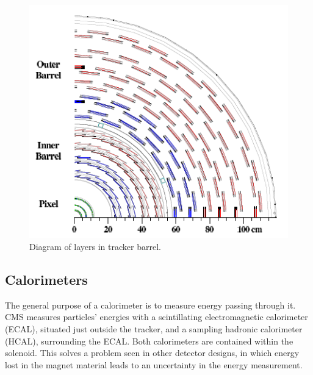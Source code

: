  \begin{figure}[htb]
  \begin{center}
    \includegraphics[width=360pt]{Figures/tracker-schematic.png}
  \end{center}
  \caption[\fixspacing Diagram of layers in tracker barrel]
	  {\fixspacing Diagram of layers in tracker barrel.}
  \label{fig:TrackerBarrel}
 \end{figure}

\subsection{Calorimeters}
\label{exp:cal}
The general purpose of a calorimeter 
is to measure energy passing through it.  
CMS measures %
particles' energies 
with a scintillating electromagnetic calorimeter (ECAL),
situated just outside the tracker,
and a sampling hadronic calorimeter (HCAL),
surrounding the ECAL.  
Both calorimeters are contained within the solenoid.  
This solves a problem seen in other detector designs, 
in which energy lost in the magnet material leads 
to an uncertainty in the energy measurement.  

